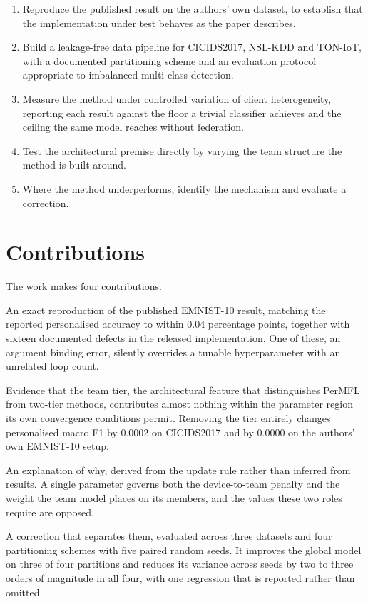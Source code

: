 \begin{enumerate}
  \item Reproduce the published result on the authors' own dataset, to
        establish that the implementation under test behaves as the paper
        describes.
  \item Build a leakage-free data pipeline for CICIDS2017, NSL-KDD and
        TON-IoT, with a documented partitioning scheme and an evaluation
        protocol appropriate to imbalanced multi-class detection.
  \item Measure the method under controlled variation of client heterogeneity,
        reporting each result against the floor a trivial classifier achieves
        and the ceiling the same model reaches without federation.
  \item Test the architectural premise directly by varying the team structure
        the method is built around.
  \item Where the method underperforms, identify the mechanism and evaluate a
        correction.
\end{enumerate}

\section{Contributions}
\label{sec:contributions}

The work makes four contributions.

An exact reproduction of the published EMNIST-10 result, matching the reported
personalised accuracy to within 0.04 percentage points, together with sixteen
documented defects in the released implementation. One of these, an argument
binding error, silently overrides a tunable hyperparameter with an unrelated
loop count.

Evidence that the team tier, the architectural feature that distinguishes
PerMFL from two-tier methods, contributes almost nothing within the parameter
region its own convergence conditions permit. Removing the tier entirely
changes personalised macro F1 by 0.0002 on CICIDS2017 and by 0.0000 on the
authors' own EMNIST-10 setup.

An explanation of why, derived from the update rule rather than inferred from
results. A single parameter governs both the device-to-team penalty and the
weight the team model places on its members, and the values these two roles
require are opposed.

A correction that separates them, evaluated across three datasets and four
partitioning schemes with five paired random seeds. It improves the global
model on three of four partitions and reduces its variance across seeds by two
to three orders of magnitude in all four, with one regression that is reported
rather than omitted.

